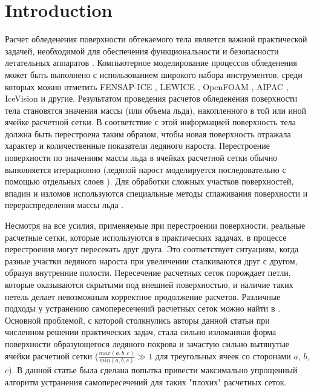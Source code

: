 \documentclass[
11pt,%
tightenlines,%
twoside,%
onecolumn,%
nofloats,%
nobibnotes,%
nofootinbib,%
superscriptaddress,%
noshowpacs,%
centertags]%
{revtex4}
\begin{document}
\maketitle

\section{Introduction}

Расчет обледенения поверхности обтекаемого тела является важной практической задачей, необходимой для обеспечения функциональности и безопасности летательных аппаратов \cite{Myers, Farzaneh, Dong, Beaugendre}.
Компьютерное моделирование процессов обледенения может быть выполнено с использованием широкого набора инструментов, среди которых можно отметить FENSAP-ICE \cite{Bourgault}, LEWICE \cite{Wright}, OpenFOAM \cite{Beld}, AIPAC \cite{Domingos}, IceVision \cite{Aksenov} и другие.
Результатом проведения расчетов обледенения поверхности тела становятся значения массы (или объема льда), накопленного в той или иной ячейке расчетной сетки.
В соответствие с этой информацией поверхность тела должна быть перестроена таким образом, чтобы новая поверхность отражала характер и количественные показатели ледяного нароста.
Перестроение поверхности по значениям массы льда в ячейках расчетной сетки обычно выполняется итерационно (ледяной нарост моделируется последовательно с помощью отдельных слоев \cite{BourgaultCote, Fortin}).
Для обработки сложных участков поверхностей, впадин и изломов используются специальные методы сглаживания поверхности и перераспределения массы льда \cite{Thompson, Tong}.

Несмотря на все усилия, применяемые при перестроении поверхности, реальные расчетные сетки, которые используются в практических задачах, в процессе перестроения могут пересекать друг друга.
Это соответствует ситуациям, когда разные участки ледяного нароста при увеличении сталкиваются друг с другом, образуя внутренние полости.
Пересечение расчетных сеток порождает петли, которые оказываются скрытыми под внешней поверхностью, и наличие таких петель делает невозможным корректное продолжение расчетов.
Различные подходы у устранению самопересечений расчетных сеток можно найти в \cite{Charton, Jung, Skorkovska}.
Основной проблемой, с которой столкнулись авторы данной статьи при численном решении практических задач, стала сильно изломанная форма поверхности образующегося ледяного покрова и зачастую сильно вытянутые ячейки расчетной сетки ($\frac{max(a, b, c)}{min(a, b, c)} \gg 1$ для треугольных ячеек со сторонами $a$, $b$, $c$).
В данной статье была сделана попытка привести максимально упрощенный алгоритм устранения самопересечений для таких "плохих" расчетных сеток.
\end{document}
